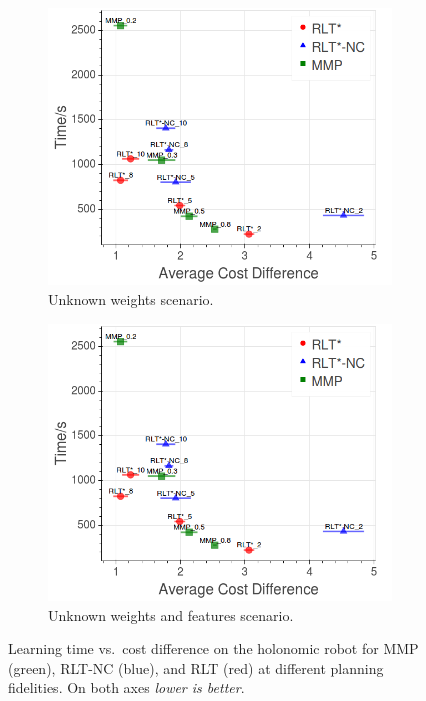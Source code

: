 \documentclass[letterpaper, 10 pt, conference]{ieeeconf}
\begin{document}
	\begin{figure}[tbh]
	\centering
	\captionsetup[subfigure]{justification=centering}
	\hspace{-1cm}
      \begin{subfigure}[b]{0.41\columnwidth}
    \includegraphics[scale=0.25]{images/pf_same.png}
    \caption{Unknown weights scenario.}
    \label{fig:res_sim1}
  \end{subfigure}
     	\hspace{10mm}
  \begin{subfigure}[b]{0.41\columnwidth}

    \includegraphics[scale=0.25]{images/pf_different.png}
    \caption{Unknown weights and features scenario.}
    \label{fig:res_sim2}
  \end{subfigure} 
    \caption{Learning time vs.\ cost difference on the holonomic robot for MMP (green), RLT-NC (blue), and RLT (red) at different planning fidelities. On both axes \emph{lower is better}.}
    \vspace{-2mm}
  \label{fig:results_sim}
  \end{figure}
\end{document}
